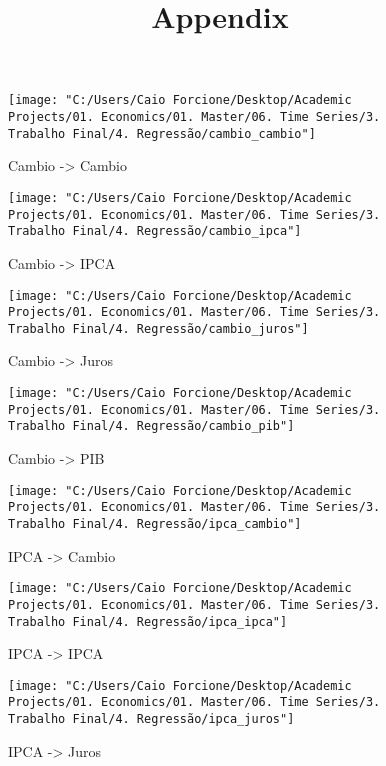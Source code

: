 \documentclass[hidelinks,12pt]{article}
\title{\textbf{Appendix}}
\date{}
\begin{document}
	
	\maketitle
	
\begin{figure}[H]
	\centering
	\texttt{[image: "C:/Users/Caio Forcione/Desktop/Academic Projects/01. Economics/01. Master/06. Time Series/3. Trabalho Final/4. Regressão/cambio\_cambio"]}
	\caption{Cambio -> Cambio}
	\label{fig:cambiocambio}
\end{figure}

	
	\begin{figure}[H]
		\centering
		\texttt{[image: "C:/Users/Caio Forcione/Desktop/Academic Projects/01. Economics/01. Master/06. Time Series/3. Trabalho Final/4. Regressão/cambio\_ipca"]}
		\caption{Cambio -> IPCA}
		\label{fig:cambioipca}
	\end{figure}
	

\begin{figure}[H]
	\centering
	\texttt{[image: "C:/Users/Caio Forcione/Desktop/Academic Projects/01. Economics/01. Master/06. Time Series/3. Trabalho Final/4. Regressão/cambio\_juros"]}
	\caption{Cambio -> Juros}
	\label{fig:cambiojuros}
\end{figure}


\begin{figure}[H]
	\centering
	\texttt{[image: "C:/Users/Caio Forcione/Desktop/Academic Projects/01. Economics/01. Master/06. Time Series/3. Trabalho Final/4. Regressão/cambio\_pib"]}
	\caption{Cambio -> PIB}
	\label{fig:cambiopib}
\end{figure}

\begin{figure}[H]
	\centering
	\texttt{[image: "C:/Users/Caio Forcione/Desktop/Academic Projects/01. Economics/01. Master/06. Time Series/3. Trabalho Final/4. Regressão/ipca\_cambio"]}
	\caption{IPCA -> Cambio}
	\label{fig:ipcacambio}
\end{figure}

\begin{figure}[H]
	\centering
	\texttt{[image: "C:/Users/Caio Forcione/Desktop/Academic Projects/01. Economics/01. Master/06. Time Series/3. Trabalho Final/4. Regressão/ipca\_ipca"]}
	\caption{IPCA -> IPCA}
	\label{fig:ipcaipca}
\end{figure}

\begin{figure}[H]
	\centering
	\texttt{[image: "C:/Users/Caio Forcione/Desktop/Academic Projects/01. Economics/01. Master/06. Time Series/3. Trabalho Final/4. Regressão/ipca\_juros"]}
	\caption{IPCA -> Juros}
	\label{fig:ipcajuros}
\end{figure}
\end{document}

